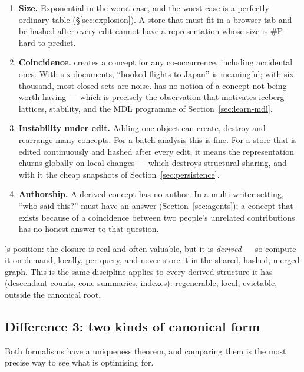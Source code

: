 \begin{enumerate}[leftmargin=1.7em]
\item \textbf{Size.} Exponential in the worst case, and the worst case is a
  perfectly ordinary table (\S\ref{sec:explosion}). A store that must fit in a
  browser tab and be hashed after every edit cannot have a representation
  whose size is $\#\mathrm{P}$-hard to predict.
\item \textbf{Coincidence.} \fca{} creates a concept for any co-occurrence,
  including accidental ones. With six documents, ``booked flights to Japan''
  is meaningful; with six thousand, most closed sets are noise. \fca{} has no
  notion of a concept not being worth having --- which is precisely the
  observation that motivates iceberg lattices, stability, and the
  MDL programme of Section~\ref{sec:learn-mdl}.
\item \textbf{Instability under edit.} Adding one object can create, destroy
  and rearrange many concepts. For a batch analysis this is fine. For a store
  that is edited continuously and hashed after every edit, it means the
  representation churns globally on local changes --- which destroys
  structural sharing, and with it the cheap snapshots of
  Section~\ref{sec:persistence}.
\item \textbf{Authorship.} A derived concept has no author. In a multi-writer
  setting, ``who said this?'' must have an answer (Section~\ref{sec:agents});
  a concept that exists because of a coincidence between two people's
  unrelated contributions has no honest answer to that question.
\end{enumerate}

\begin{keyidea}
\odag{}'s position: the closure is real and often valuable, but it is
\emph{derived} --- so compute it on demand, locally, per query, and never
store it in the shared, hashed, merged graph. This is the same discipline
\odag{} applies to every derived structure it has (descendant counts, cone
summaries, indexes): regenerable, local, evictable, outside the canonical
root.
\end{keyidea}

\subsection{Difference 3: two kinds of canonical form}
\label{sec:two-canonical-forms}

Both formalisms have a uniqueness theorem, and comparing them is the most
precise way to see what \odag{} is optimising for.

